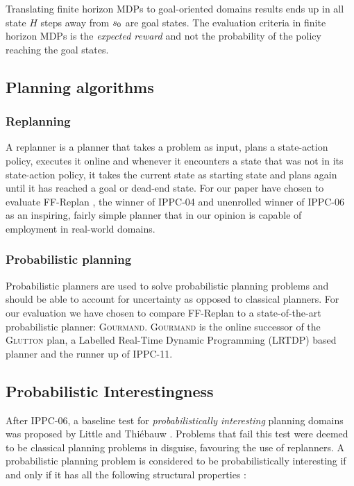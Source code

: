 \documentclass[runningheads,a4paper]{llncs}
\begin{document}
Translating finite horizon MDPs to goal-oriented domains results ends up in all state $H$ steps away from $s\textsubscript{0}$ are goal states. The evaluation criteria in finite horizon MDPs is the \emph{expected reward} and not the probability of the policy reaching the goal states.

\subsection{Planning algorithms}
\subsubsection{Replanning}
A replanner is a planner that takes a problem as input, plans a state-action policy, executes it online and whenever it encounters a state that was not in its state-action policy, it takes the current state as starting state and plans again until it has reached a goal or dead-end state. For our paper have chosen to evaluate FF-Replan \cite{FFReplan}, the winner of IPPC-04 and unenrolled winner of IPPC-06 as an inspiring, fairly simple planner that in our opinion is capable of employment in real-world domains.

\subsubsection{Probabilistic planning}
Probabilistic planners are used to solve probabilistic planning problems and should be able to account for uncertainty as opposed to classical planners. For our evaluation we have chosen to compare FF-Replan to a state-of-the-art probabilistic planner: \textsc{Gourmand}. \textsc{Gourmand} is the online successor of the \textsc{Glutton} plan, a Labelled Real-Time Dynamic Programming (LRTDP) based planner and the runner up of IPPC-11.

\subsection{Probabilistic Interestingness}
After IPPC-06, a baseline test for \emph{probabilistically interesting} planning domains was proposed by Little and Thi\'ebauw \cite{little2007probvsreplan}.  Problems that fail this test were deemed to be classical planning problems in disguise, favouring the use of replanners. A probabilistic planning problem is considered to be probabilistically interesting if and only if it has all the following structural properties \cite{little2007probvsreplan}:
\end{document}

